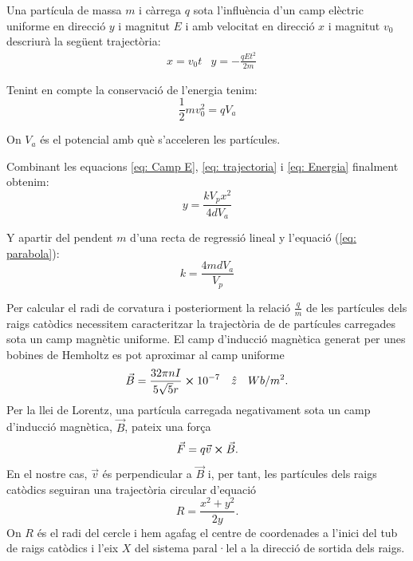 \documentclass[11pt]{article}
\begin{document}
Una partícula de massa $m$ i càrrega $q$ sota l'influència d'un camp elèctric uniforme en direcció $y$ i magnitut $E$ i amb velocitat en direcció $x$ i magnitut $v_0$ descriurà la següent trajectòria:
\begin{align}
    &x = v_0 t      &y = -\frac{qEt^2}{2m}
    \label{eq: trajectoria}
\end{align}

Tenint en compte la conservació de l'energia tenim:
\begin{equation}
    \frac{1}{2}mv_0^2=qV_a
    \label{eq: Energia}
\end{equation}

On $V_a$ és el potencial amb què s'acceleren les partícules.

Combinant les equacions \ref{eq: Camp E}, \ref{eq: trajectoria} i \ref{eq: Energia} finalment obtenim:
\begin{equation}
    y = \frac{kV_px^2}{4dV_a}
    \label{eq: parabola}
\end{equation}

Y apartir del pendent $m$ d'una recta de regressió lineal y l'equació (\ref{eq: parabola}):
 \begin{equation}
      k =\frac{4mdV_a}{V_p}
      \label{eq: k}
 \end{equation}

\vspace{1cm}

Per calcular el radi de corvatura i posteriorment la relació $\frac{q}{m}$ de les partícules dels raigs catòdics necessitem caracteritzar la trajectòria de de partícules carregades sota un camp magnètic uniforme. El camp d'inducció magnètica generat per unes bobines de Hemholtz es pot aproximar al camp uniforme 
\begin{equation}
    \vec{B}=\frac{32\pi nI}{5\sqrt{5}r}\cross10^{-7} \quad \hat{z}\quad Wb/m^2.
    \label{eq: B}
\end{equation}
Per la llei de Lorentz, una partícula carregada negativament sota un camp d'inducció magnètica, $\vec{B}$, pateix una força
\begin{equation}
    \vec{F}=q\vec{v}\cross\vec{B}.
    \label{eq: Lorentz} 
\end{equation} 
En el nostre cas, $\vec{v}$ és perpendicular a $\vec{B }$ i, per tant, les partícules dels raigs catòdics seguiran una trajectòria circular d'equació
\begin{equation}
    R=\frac{x^2+y^2}{2y}.
    \label{eq: radi}
\end{equation}
On $R$ és el radi del cercle i hem agafag el centre de coordenades a l'inici del tub de raigs catòdics i l'eix $X$ del sistema paral·lel a la direcció de sortida dels raigs.
\end{document}
